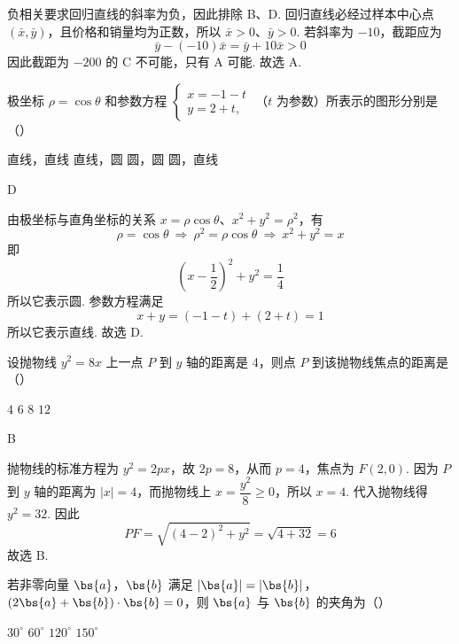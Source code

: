 \begin{solution}
负相关要求回归直线的斜率为负，因此排除 B、D. 回归直线必经过样本中心点 \((\bar{x},\bar{y})\)，且价格和销量均为正数，所以 \(\bar{x}>0\)、\(\bar{y}>0\). 若斜率为 \(-10\)，截距应为
\[
\bar{y}-(-10)\bar{x}=\bar{y}+10\bar{x}>0
\]
因此截距为 \(-200\) 的 C 不可能，只有 A 可能.
故选 A.
\end{solution}

\begin{problem}
极坐标 \(\rho = \cos \theta\) 和参数方程 \(\begin{cases}
x = -1 - t\\
y = 2 + t,
\end{cases}\) （\(t\) 为参数）所表示的图形分别是（\quad）

\choices
    {直线，直线}
    {直线，圆}
    {圆，圆}
    {圆，直线}
\end{problem}

\begin{answer}
D
\end{answer}

\begin{solution}
由极坐标与直角坐标的关系 \(x=\rho\cos\theta\)、\(x^2+y^2=\rho^2\)，有
\[
\rho=\cos\theta\ \Longrightarrow\ \rho^2=\rho\cos\theta\ \Longrightarrow\ x^2+y^2=x
\]
即
\[
\left(x-\frac12\right)^2+y^2=\frac14
\]
所以它表示圆. 参数方程满足
\[
x+y=(-1-t)+(2+t)=1
\]
所以它表示直线. 故选 D.
\end{solution}

\begin{problem}
设抛物线 \( y^{2} = 8x \) 上一点 \(P\) 到 \( y \) 轴的距离是 4，则点 \(P\) 到该抛物线焦点的距离是（\quad）

\choices
    {\(4\)}
    {\(6\)}
    {\(8\)}
    {\(12\)}
\end{problem}

\begin{answer}
B
\end{answer}

\begin{solution}
抛物线的标准方程为 \(y^2=2px\)，故 \(2p=8\)，从而 \(p=4\)，焦点为 \(F(2,0)\). 因为 \(P\) 到 \(y\) 轴的距离为 \(|x|=4\)，而抛物线上 \(x=\dfrac{y^2}{8}\geqslant0\)，所以 \(x=4\). 代入抛物线得 \(y^2=32\). 因此
\[
PF=\sqrt{(4-2)^2+y^2}=\sqrt{4+32}=6
\]
故选 B.
\end{solution}

\begin{problem}
若非零向量 \(\bs{a}\)，\(\bs{b}\) 满足 \(|\bs{a}| = |\bs{b}|\)，\((2\bs{a} + \bs{b}) \cdot \bs{b} = 0\)，则 \(\bs{a}\) 与 \(\bs{b}\) 的夹角为（\quad）

\choices
    {\(30^{\circ}\)}
    {\(60^{\circ}\)}
    {\(120^{\circ}\)}
    {\(150^{\circ}\)}
\end{problem}

